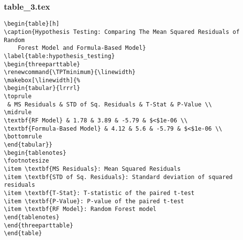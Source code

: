 \documentclass[11pt]{article}
\begin{document}
\subsubsection*{table\_3.tex}

\begin{Verbatim}[tabsize=4]
\begin{table}[h]
\caption{Hypothesis Testing: Comparing The Mean Squared Residuals of Random
	Forest Model and Formula-Based Model}
\label{table:hypothesis_testing}
\begin{threeparttable}
\renewcommand{\TPTminimum}{\linewidth}
\makebox[\linewidth]{%
\begin{tabular}{lrrrl}
\toprule
 & MS Residuals & STD of Sq. Residuals & T-Stat & P-Value \\
\midrule
\textbf{RF Model} & 1.78 & 3.89 & -5.79 & $<$1e-06 \\
\textbf{Formula-Based Model} & 4.12 & 5.6 & -5.79 & $<$1e-06 \\
\bottomrule
\end{tabular}}
\begin{tablenotes}
\footnotesize
\item \textbf{MS Residuals}: Mean Squared Residuals
\item \textbf{STD of Sq. Residuals}: Standard deviation of squared residuals
\item \textbf{T-Stat}: T-statistic of the paired t-test
\item \textbf{P-Value}: P-value of the paired t-test
\item \textbf{RF Model}: Random Forest model
\end{tablenotes}
\end{threeparttable}
\end{table}

\end{Verbatim}
\end{document}
